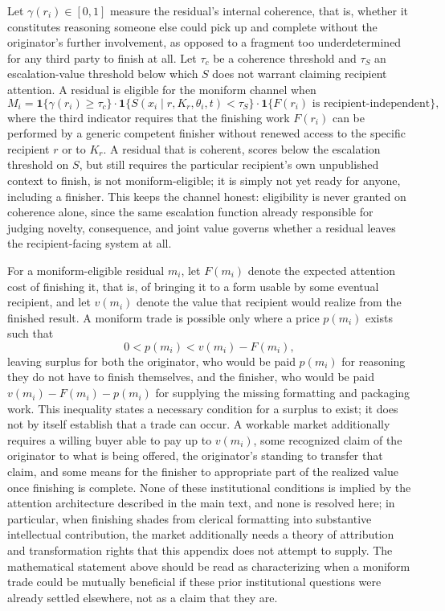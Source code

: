 \documentclass[11pt]{article}
\begin{document}
Let $\gamma(r_i) \in [0,1]$ measure the residual's internal coherence, that is, whether it constitutes reasoning someone else could pick up and complete without the originator's further involvement, as opposed to a fragment too underdetermined for any third party to finish at all. Let $\tau_c$ be a coherence threshold and $\tau_S$ an escalation-value threshold below which $S$ does not warrant claiming recipient attention. A residual is eligible for the moniform channel when
\[
M_i = \mathbf{1}\{\gamma(r_i) \ge \tau_c\}\cdot\mathbf{1}\{S(x_i \mid r, K_r, \theta_i, t) < \tau_S\}\cdot\mathbf{1}\{F(r_i)\text{ is recipient-independent}\},
\]
where the third indicator requires that the finishing work $F(r_i)$ can be performed by a generic competent finisher without renewed access to the specific recipient $r$ or to $K_r$. A residual that is coherent, scores below the escalation threshold on $S$, but still requires the particular recipient's own unpublished context to finish, is not moniform-eligible; it is simply not yet ready for anyone, including a finisher. This keeps the channel honest: eligibility is never granted on coherence alone, since the same escalation function already responsible for judging novelty, consequence, and joint value governs whether a residual leaves the recipient-facing system at all.

For a moniform-eligible residual $m_i$, let $F(m_i)$ denote the expected attention cost of finishing it, that is, of bringing it to a form usable by some eventual recipient, and let $v(m_i)$ denote the value that recipient would realize from the finished result. A moniform trade is possible only where a price $p(m_i)$ exists such that
\[
0 < p(m_i) < v(m_i) - F(m_i),
\]
leaving surplus for both the originator, who would be paid $p(m_i)$ for reasoning they do not have to finish themselves, and the finisher, who would be paid $v(m_i) - F(m_i) - p(m_i)$ for supplying the missing formatting and packaging work. This inequality states a necessary condition for a surplus to exist; it does not by itself establish that a trade can occur. A workable market additionally requires a willing buyer able to pay up to $v(m_i)$, some recognized claim of the originator to what is being offered, the originator's standing to transfer that claim, and some means for the finisher to appropriate part of the realized value once finishing is complete. None of these institutional conditions is implied by the attention architecture described in the main text, and none is resolved here; in particular, when finishing shades from clerical formatting into substantive intellectual contribution, the market additionally needs a theory of attribution and transformation rights that this appendix does not attempt to supply. The mathematical statement above should be read as characterizing when a moniform trade could be mutually beneficial if these prior institutional questions were already settled elsewhere, not as a claim that they are.
\end{document}
